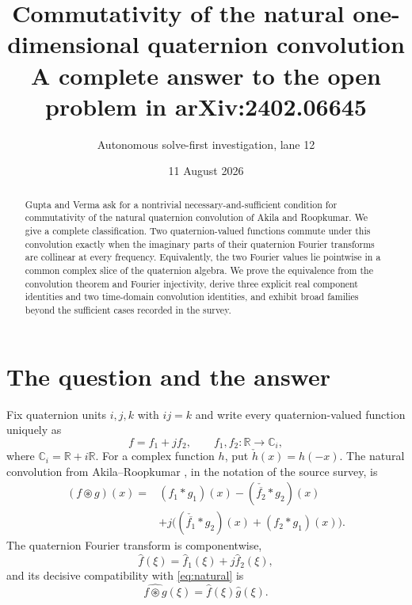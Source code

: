 \documentclass[11pt]{article}
\title{Commutativity of the natural one-dimensional quaternion convolution\\
\large A complete answer to the open problem in arXiv:2402.06645}
\author{Autonomous solve-first investigation, lane 12}
\date{11 August 2026}
\newcommand{\C}{\mathbb C}
\newcommand{\R}{\mathbb R}
\newcommand{\ostar}{\mathbin{\circledast}}
\begin{document}
\maketitle

\begin{abstract}
Gupta and Verma ask for a nontrivial necessary-and-sufficient condition for
commutativity of the natural quaternion convolution of Akila and Roopkumar.
We give a complete classification.  Two quaternion-valued functions commute
under this convolution exactly when the imaginary parts of their quaternion
Fourier transforms are collinear at every frequency.  Equivalently, the two
Fourier values lie pointwise in a common complex slice of the quaternion
algebra.  We prove the equivalence from the convolution theorem and Fourier
injectivity, derive three explicit real component identities and two
time-domain convolution identities, and exhibit broad families beyond the
sufficient cases recorded in the survey.
\end{abstract}

\section{The question and the answer}

Fix quaternion units $i,j,k$ with $ij=k$ and write every quaternion-valued
function uniquely as
\[
                 f=f_1+jf_2,\qquad f_1,f_2:\R\to\C_i,
\]
where $\C_i=\R+i\R$.  For a complex function $h$, put
$\check h(x)=h(-x)$.  The natural convolution from
Akila--Roopkumar \cite{AR}, in the notation of the source survey, is
\begin{equation}\label{eq:natural}
\begin{split}
(f\ostar g)(x)
={}&(f_1*g_1)(x)-(\check{\overline{f_2}}*g_2)(x)\\
 &+j\big((\check{\overline{f_1}}*g_2)(x)+(f_2*g_1)(x)\big).
\end{split}
\end{equation}
The quaternion Fourier transform is componentwise,
\begin{equation}\label{eq:qft}
                 \widehat f(\xi)=\widehat f_1(\xi)+j\widehat f_2(\xi),
\end{equation}
and its decisive compatibility with \eqref{eq:natural} is
\begin{equation}\label{eq:convthm}
                 \widehat{f\ostar g}(\xi)=\widehat f(\xi)\widehat g(\xi).
\end{equation}
\end{document}
